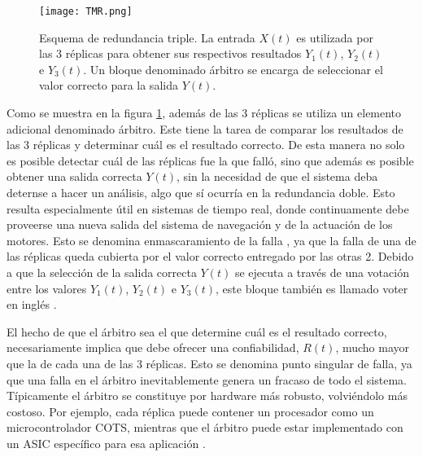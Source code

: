 \begin{figure}[htb]
    \centering
    \texttt{[image: TMR.png]}
    \caption{Esquema de redundancia triple. La entrada $X(t)$ es utilizada por las 3 réplicas para obtener sus respectivos resultados $Y_1(t)$, $Y_2(t)$ e $Y_3(t)$. Un bloque denominado árbitro se encarga de seleccionar el valor correcto para la salida $Y(t)$.}
    \label{fig:TMR}
\end{figure}



Como se muestra en la figura \ref{fig:TMR}, además de las 3 réplicas se utiliza un elemento adicional denominado árbitro. Este tiene la tarea de comparar los resultados de las 3 réplicas y determinar cuál es el resultado correcto. De esta manera no solo es posible detectar cuál de las réplicas fue la que falló, sino que además es posible obtener una salida correcta $Y(t)$, sin la necesidad de que el sistema deba deternse a hacer un análisis, algo que sí ocurría en la redundancia doble. Esto resulta especialmente útil en sistemas de tiempo real, donde continuamente debe proveerse una nueva salida del sistema de navegación y de la actuación de los motores. Esto se denomina enmascaramiento de la falla \cite{nelson1990fault}, ya que la falla de una de las réplicas queda cubierta por el valor correcto entregado por las otras 2. Debido a que la selección de la salida correcta $Y(t)$ se ejecuta a través de una votación entre los valores $Y_1(t)$, $Y_2(t)$ e $Y_3(t)$, este bloque también es llamado voter en inglés \cite{lyons1962use}.

El hecho de que el árbitro sea el que determine cuál es el resultado correcto, necesariamente implica que debe ofrecer una confiabilidad, $R(t)$, mucho mayor que la de cada una de las 3 réplicas. Esto se denomina punto singular de falla, ya que una falla en el árbitro inevitablemente genera un fracaso de todo el sistema. Típicamente el árbitro se constituye por hardware más robusto, volviéndolo más costoso. Por ejemplo, cada réplica puede contener un procesador como un microcontrolador COTS, mientras que el árbitro puede estar implementado con un ASIC específico para esa aplicación \cite{hiergeist2017internal}.

